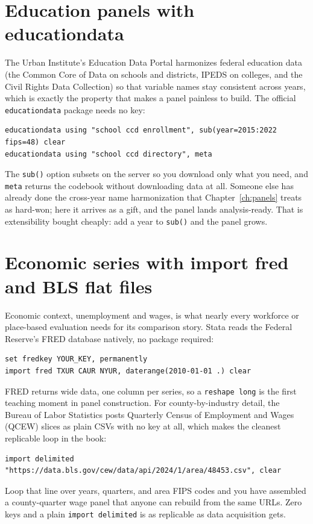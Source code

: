 \documentclass[
    a4paper,
    fontsize=10pt,
    twoside=true,
    numbers=noenddot,
]{kaobook}
\begin{document}
\section{Education panels with educationdata}
The Urban Institute's Education Data Portal harmonizes federal education data (the Common Core of Data on schools and districts, IPEDS on colleges, and the Civil Rights Data Collection) so that variable names stay consistent across years, which is exactly the property that makes a panel painless to build. The official \texttt{educationdata} package needs no key:
{\footnotesize
\begin{verbatim}
educationdata using "school ccd enrollment", sub(year=2015:2022 fips=48) clear
educationdata using "school ccd directory", meta
\end{verbatim}
}
The \texttt{sub()} option subsets on the server so you download only what you need, and \texttt{meta} returns the codebook without downloading data at all. Someone else has already done the cross-year name harmonization that Chapter~\ref{ch:panels} treats as hard-won; here it arrives as a gift, and the panel lands analysis-ready. That is extensibility bought cheaply: add a year to \texttt{sub()} and the panel grows.

\section{Economic series with import fred and BLS flat files}
Economic context, unemployment and wages, is what nearly every workforce or place-based evaluation needs for its comparison story. Stata reads the Federal Reserve's FRED database natively, no package required:
{\footnotesize
\begin{verbatim}
set fredkey YOUR_KEY, permanently
import fred TXUR CAUR NYUR, daterange(2010-01-01 .) clear
\end{verbatim}
}
FRED returns wide data, one column per series, so a \texttt{reshape long} is the first teaching moment in panel construction. For county-by-industry detail, the Bureau of Labor Statistics posts Quarterly Census of Employment and Wages (QCEW) slices as plain CSVs with no key at all, which makes the cleanest replicable loop in the book:
{\footnotesize
\begin{verbatim}
import delimited "https://data.bls.gov/cew/data/api/2024/1/area/48453.csv", clear
\end{verbatim}
}
Loop that line over years, quarters, and area FIPS codes and you have assembled a county-quarter wage panel that anyone can rebuild from the same URLs. Zero keys and a plain \texttt{import delimited} is as replicable as data acquisition gets.
\end{document}
